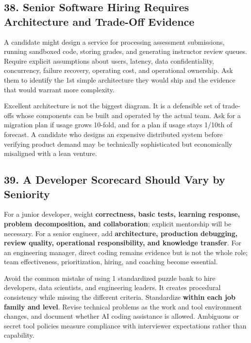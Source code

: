 \subsection*{38. Senior Software Hiring Requires Architecture and Trade-Off Evidence}

A candidate might design a service for processing assessment submissions, running sandboxed code, storing grades, and generating instructor review queues. Require explicit assumptions about users, latency, data confidentiality, concurrency, failure recovery, operating cost, and operational ownership. Ask them to identify the 1st simple architecture they would ship and the evidence that would warrant more complexity.

Excellent architecture is not the biggest diagram. It is a defensible set of trade-offs whose components can be built and operated by the actual team. Ask for a migration plan if usage grows 10-fold, and for a plan if usage stays 1/10th of forecast. A candidate who designs an expensive distributed system before verifying product demand may be technically sophisticated but economically misaligned with a lean venture.

\subsection*{39. A Developer Scorecard Should Vary by Seniority}

For a junior developer, weight \textbf{correctness, basic tests, learning response, problem decomposition, and collaboration}; explicit mentorship will be necessary. For a senior engineer, add \textbf{architecture, production debugging, review quality, operational responsibility, and knowledge transfer}. For an engineering manager, direct coding remains evidence but is not the whole role; team effectiveness, prioritization, hiring, and coaching become essential.

Avoid the common mistake of using 1 standardized puzzle bank to hire developers, data scientists, and engineering leaders. It creates procedural consistency while missing the different criteria. Standardize \textbf{within each job family and level}. Revise technical problems as the work and tool environment changes, and document whether AI coding assistance is allowed. Ambiguous or secret tool policies measure compliance with interviewer expectations rather than capability.

